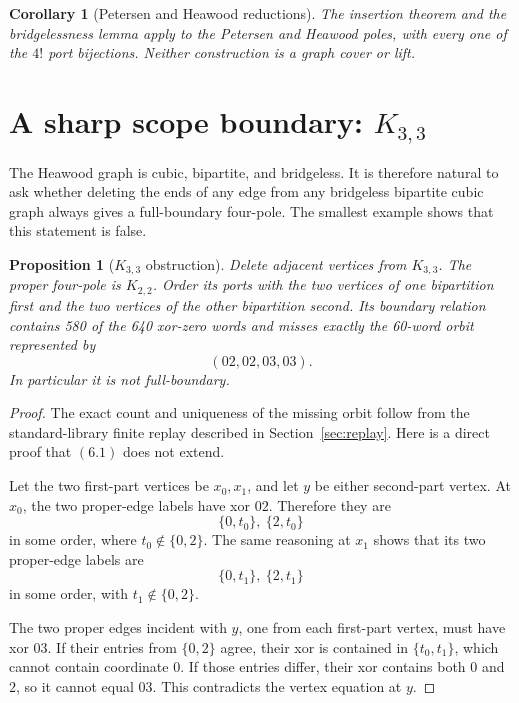 \documentclass[11pt]{article}
\newtheorem{corollary}[theorem]{Corollary}
\newtheorem{proposition}[theorem]{Proposition}
\theoremstyle{definition}
\theoremstyle{remark}
\begin{document}
\begin{corollary}[Petersen and Heawood reductions]\label{cor:two-poles}
The insertion theorem and the bridgelessness lemma apply to the
Petersen and Heawood poles, with every one of the \(4!\) port bijections.
Neither construction is a graph cover or lift.
\end{corollary}

\section{A sharp scope boundary: \(K_{3,3}\)}

The Heawood graph is cubic, bipartite, and bridgeless.  It is therefore
natural to ask whether deleting the ends of any edge from any bridgeless
bipartite cubic graph always gives a full-boundary four-pole.  The smallest
example shows that this statement is false.

\begin{proposition}[\(K_{3,3}\) obstruction]\label{prop:k33}
Delete adjacent vertices from \(K_{3,3}\).  The proper four-pole is
\(K_{2,2}\).  Order its ports with the two vertices of one bipartition
first and the two vertices of the other bipartition second.  Its boundary
relation contains 580 of the 640 xor-zero words and misses exactly the
60-word orbit represented by
\[
                              (02,02,03,03).              \tag{6.1}
\]
In particular it is not full-boundary.
\end{proposition}

\begin{proof}
The exact count and uniqueness of the missing orbit follow from the
standard-library finite replay described in Section~\ref{sec:replay}.
Here is a direct proof that \((6.1)\) does not extend.

Let the two first-part vertices be \(x_0,x_1\), and let \(y\) be either
second-part vertex.  At \(x_0\), the two proper-edge labels have xor \(02\).
Therefore they are
\[
                         \{0,t_0\},\ \{2,t_0\}
\]
in some order, where \(t_0\notin\{0,2\}\).  The same reasoning at \(x_1\)
shows that its two proper-edge labels are
\[
                         \{0,t_1\},\ \{2,t_1\}
\]
in some order, with \(t_1\notin\{0,2\}\).

The two proper edges incident with \(y\), one from each first-part vertex,
must have xor \(03\).  If their entries from \(\{0,2\}\) agree, their xor
is contained in \(\{t_0,t_1\}\), which cannot contain coordinate \(0\).
If those entries differ, their xor contains both \(0\) and \(2\), so it
cannot equal \(03\).  This contradicts the vertex equation at \(y\).
\end{proof}
\end{document}
